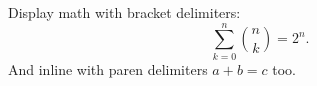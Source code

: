 \documentclass{article}
\begin{document}
Display math with bracket delimiters:
\[
  \sum_{k=0}^{n} \binom{n}{k} = 2^n.
\]
And inline with paren delimiters \(a+b=c\) too.
\end{document}
